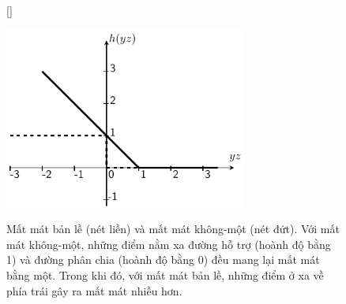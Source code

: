 \begin{figure}[t]
    [\FBwidth]
    {\caption{ 
    Mất mát bản lề (nét liền) và mất mát không-một (nét đứt). Với mất mát không-một, những
    điểm nằm xa đường hỗ trợ (hoành độ bằng 1) và đường phân chia (hoành độ bằng 0) đều mang lại mất mát bằng một. Trong khi đó, với mất mát bản lề, những điểm ở xa về
    phía trái gây ra mất mát nhiều hơn. }
    \label{fig:20_3}}
    { %
    \includegraphics[width=8cm]{Chapters/09_SupportVectorMachines/20_softmarginsvm/latex/hinge.pdf}
    }
\end{figure}


